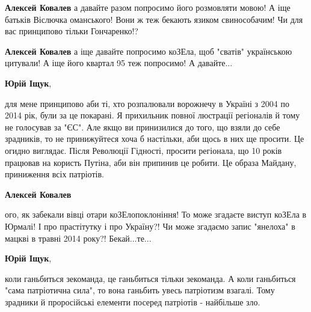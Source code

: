 \begin{itemize}
\begin{itemize}
\textbf{Алексей Ковалев} а давайте разом попросимо його розмовляти мовою! А іще батьків Віслючка оманського! Вони ж теж бекають язиком свинособачим! Чи для вас принципово тільки Гончаренко!?

 
\textbf{Алексей Ковалев} а іще давайте попросимо коЗЕла, щоб "сватів" українською цитували! А іще його квартал 95 теж попросимо! А давайте...

 
\textbf{Юрій Іщук}, 

для мене принципово аби ті, хто розпалювали ворожнечу в Україні з 2004 по 2014
рік, були за це покарані. Я прихильник повної люстрації регіоналів й тому не
голосував за "ЄС". Але якщо ви принизилися до того, що взяли до себе зрадників,
то не принижуйтеся хоча б настільки, аби щось в них ще просити. Це огидно
виглядає. Після Революції Гідності, просити регіонала, що 10 років працював на
користь Путіна, аби він припинив це робити. Це образа Майдану, приниження всіх
патріотів.


 
\textbf{Алексей Ковалев} 

ого, як забекали вівці отари коЗЕлопоклоніння! То може згадаєте виступ коЗЕла в
Юрмалі! І про прастітутку і про Україну?! Чи може згадаємо запис "янелоха" в
мацкві в травні 2014 року?! Бекай...те...

 
\textbf{Юрій Іщук}, 

коли ганьбиться зекоманда, це ганьбиться тільки зекоманда. А коли ганьбиться
"сама патріотична сила", то вона ганьбить увесь патріотизм взагалі. Тому
зрадники й проросійські елементи посеред патріотів - найбільше зло.



\end{itemize}
\end{itemize}
